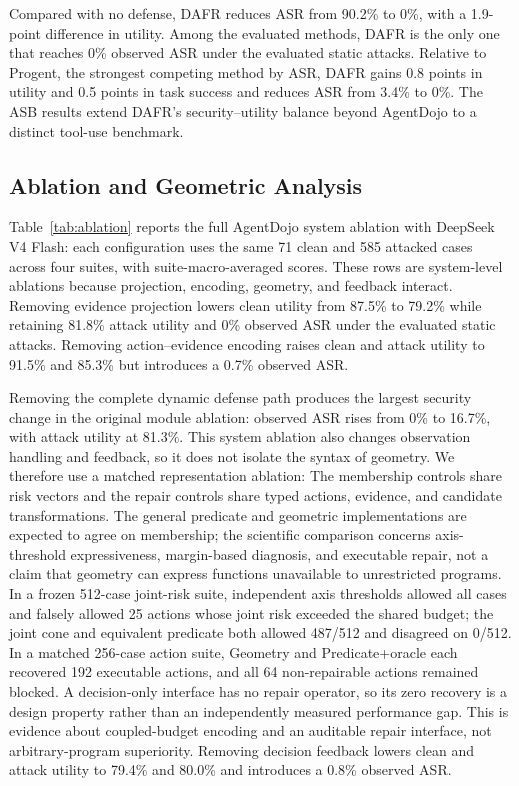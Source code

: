 \documentclass[letterpaper]{article}
\begin{document}
Compared with no defense, DAFR reduces ASR from 90.2\% to 0\%, with a 1.9-point difference in utility. Among the evaluated methods, DAFR is the only one that reaches 0\% observed ASR under the evaluated static attacks. Relative to Progent, the strongest competing method by ASR, DAFR gains 0.8 points in utility and 0.5 points in task success and reduces ASR from 3.4\% to 0\%. The ASB results extend DAFR's security--utility balance beyond AgentDojo to a distinct tool-use benchmark.

\subsection{Ablation and Geometric Analysis}

Table~\ref{tab:ablation} reports the full AgentDojo system ablation with DeepSeek V4 Flash: each configuration uses the same 71 clean and 585 attacked cases across four suites, with suite-macro-averaged scores. These rows are system-level ablations because projection, encoding, geometry, and feedback interact. Removing evidence projection lowers clean utility from 87.5\% to 79.2\% while retaining 81.8\% attack utility and 0\% observed ASR under the evaluated static attacks. Removing action--evidence encoding raises clean and attack utility to 91.5\% and 85.3\% but introduces a 0.7\% observed ASR.

Removing the complete dynamic defense path produces the largest security change in the original module ablation: observed ASR rises from 0\% to 16.7\%, with attack utility at 81.3\%. This system ablation also changes observation handling and feedback, so it does not isolate the syntax of geometry. We therefore use a matched representation ablation: The membership controls share risk vectors and the repair controls share typed actions, evidence, and candidate transformations. The general predicate and geometric implementations are expected to agree on membership; the scientific comparison concerns axis-threshold expressiveness, margin-based diagnosis, and executable repair, not a claim that geometry can express functions unavailable to unrestricted programs. In a frozen 512-case joint-risk suite, independent axis thresholds allowed all cases and falsely allowed 25 actions whose joint risk exceeded the shared budget; the joint cone and equivalent predicate both allowed 487/512 and disagreed on 0/512. In a matched 256-case action suite, Geometry and Predicate+oracle each recovered 192 executable actions, and all 64 non-repairable actions remained blocked. A decision-only interface has no repair operator, so its zero recovery is a design property rather than an independently measured performance gap. This is evidence about coupled-budget encoding and an auditable repair interface, not arbitrary-program superiority. Removing decision feedback lowers clean and attack utility to 79.4\% and 80.0\% and introduces a 0.8\% observed ASR.
\end{document}

